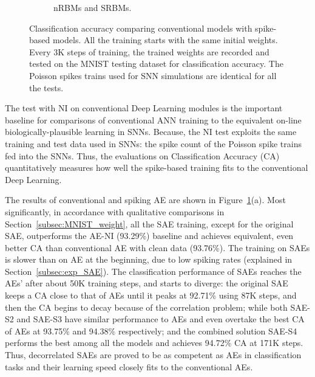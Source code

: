 \begin{figure}
\begin{subfigure}[t]{0.8\textwidth}
		\caption{nRBMs and SRBMs.}
	\end{subfigure}
	\caption[Comparisons of classification accuracy between conventional and spiking models.]{Classification accuracy comparing conventional models with spike-based models. All the training starts with the same initial weights. Every 3K steps of training, the trained weights are recorded and tested on the MNIST testing dataset for classification accuracy. The Poisson spikes trains used for SNN simulations are identical for all the tests.}
	\label{fig:sdlm_ca}
\end{figure}

The test with NI on conventional Deep Learning modules is the important baseline for comparisons of conventional ANN training to the equivalent on-line biologically-plausible learning in SNNs.
Because, the NI test exploits the same training and test data used in SNNs: the spike count of the Poisson spike trains fed into the SNNs.
Thus, the evaluations on Classification Accuracy (CA) quantitatively measures how well the spike-based training fits to the conventional Deep Learning.


The results of conventional and spiking AE are shown in Figure~\ref{fig:sdlm_ca}(a).
Most significantly, in accordance with qualitative comparisons in Section~\ref{subsec:MNIST_weight}, all the SAE training, except for the original SAE, outperforms the AE-NI (93.29\%) baseline and achieves equivalent, even better CA than conventional AE with clean data (93.76\%).
The training on SAEs is slower than on AE at the beginning, due to low spiking rates (explained in Section~\ref{subsec:exp_SAE}).
The classification performance of SAEs reaches the AEs' after about 50K training steps, and starts to diverge:
the original SAE keeps a CA close to that of AEs until it peaks at 92.71\% using 87K steps, and then the CA begins to decay because of the correlation problem;
while both SAE-S2 and SAE-S3 have similar performance to AEs and even overtake the best CA of AEs at 93.75\% and 94.38\% respectively;
and the combined solution SAE-S4 performs the best among all the models and achieves 94.72\% CA at 171K steps.
Thus, decorrelated SAEs are proved to be as competent as AEs in classification tasks and their learning speed closely fits to the conventional AEs.

